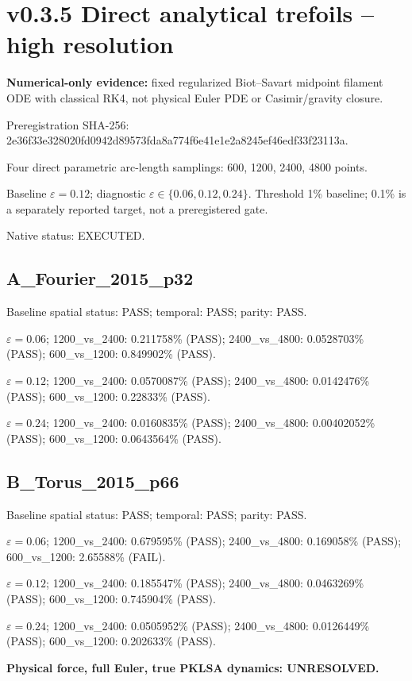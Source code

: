 \documentclass[10pt,a4paper]{article}
\begin{document}
\section{v0.3.5 Direct analytical trefoils -- high resolution}\textbf{Numerical-only evidence:} fixed regularized Biot--Savart midpoint filament ODE with classical RK4, not physical Euler PDE or Casimir/gravity closure. \par Preregistration SHA-256: 2e36f33e328020fd0942d89573fda8a774f6e41e1e2a8245ef46edf33f23113a. \par Four direct parametric arc-length samplings: 600, 1200, 2400, 4800 points. \par Baseline $\varepsilon=0.12$; diagnostic $\varepsilon\in\{0.06,0.12,0.24\}$. Threshold 1\% baseline; 0.1\% is a separately reported target, not a preregistered gate. \par Native status: EXECUTED.\subsection{A\_Fourier\_2015\_p32}Baseline spatial status: PASS; temporal: PASS; parity: PASS.\par $\varepsilon=0.06$; 1200\_vs\_2400: 0.211758\% (PASS); 2400\_vs\_4800: 0.0528703\% (PASS); 600\_vs\_1200: 0.849902\% (PASS).\par $\varepsilon=0.12$; 1200\_vs\_2400: 0.0570087\% (PASS); 2400\_vs\_4800: 0.0142476\% (PASS); 600\_vs\_1200: 0.22833\% (PASS).\par $\varepsilon=0.24$; 1200\_vs\_2400: 0.0160835\% (PASS); 2400\_vs\_4800: 0.00402052\% (PASS); 600\_vs\_1200: 0.0643564\% (PASS).\subsection{B\_Torus\_2015\_p66}Baseline spatial status: PASS; temporal: PASS; parity: PASS.\par $\varepsilon=0.06$; 1200\_vs\_2400: 0.679595\% (PASS); 2400\_vs\_4800: 0.169058\% (PASS); 600\_vs\_1200: 2.65588\% (FAIL).\par $\varepsilon=0.12$; 1200\_vs\_2400: 0.185547\% (PASS); 2400\_vs\_4800: 0.0463269\% (PASS); 600\_vs\_1200: 0.745904\% (PASS).\par $\varepsilon=0.24$; 1200\_vs\_2400: 0.0505952\% (PASS); 2400\_vs\_4800: 0.0126449\% (PASS); 600\_vs\_1200: 0.202633\% (PASS).\par\textbf{Physical force, full Euler, true PKLSA dynamics: UNRESOLVED.}
\end{document}
